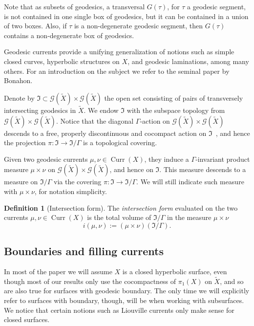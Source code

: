 \documentclass[12pt,article]{amsart}
\numberwithin{equation}{section}
\numberwithin{figure}{section}
\theoremstyle{definition}
\newtheorem{definition}[equation]{Definition}
\theoremstyle{plain}
\DeclareMathOperator{\Curr}{Curr}
\newcommand*{\wt}[1]{\widetilde{#1}}
\begin{document}
  Note that as subsets of geodesics, a transversal $G(\tau)$, for $\tau$ a geodesic segment, is not contained in one single box of geodesics, but it can be contained in a union of two boxes. Also, if $\tau$ is a non-degenerate geodesic segment, then $G(\tau)$ contains a non-degenerate box of geodesics.
 
 Geodesic currents provide a unifying generalization of notions such as simple closed curves, hyperbolic structures on $X$, and geodesic laminations, among many others. For an introduction on the subject we refer to the seminal paper \cite{Bonahon88:GeodesicCurrent} by Bonahon.
 
 
 Denote by $\mathfrak{I} \subset  \mathcal{G}(\wt{X}) \times  \mathcal{G}(\wt{X})$ the open set consisting of pairs of transversely intersecting geodesics in $\wt{X}$. 
 We endow $\mathfrak{I}$ with the subspace topology from $\mathcal{G}(\wt{X}) \times  \mathcal{G}(\wt{X})$. Notice that the diagonal $\Gamma$-action on $\mathcal{G}(\wt{X}) \times \mathcal{G}(\wt{X})$ descends to a free, properly discontinuous and cocompact action on $\mathfrak{I}$~\cite[Page~44]{ES22:GeodesicCount}, and hence the projection $\pi \colon \mathfrak{I} \to \mathfrak{I}/\Gamma$ is a topological covering. 
 
 Given two geodesic currents $\mu, \nu \in \Curr(X)$, they induce a $\Gamma$-invariant product measure $\mu \times \nu$ on $\mathcal{G}(\wt{X}) \times \mathcal{G}(\wt{X})$, and hence on $\mathfrak{I}$. This measure descends to a measure on $\mathfrak{I}/\Gamma$ via the covering $\pi \colon \mathfrak{I} \to \mathfrak{I}/\Gamma$. We will still indicate such measure  with $\mu \times \nu$, for notation simplicity. 
 
 \begin{definition}[Intersection form]
 The \emph{intersection form} evaluated on the two currents $\mu, \nu \in \Curr(X)$ is the total volume of $\mathfrak{I}/\Gamma$ in the measure $\mu \times \nu$
 \[
 i(\mu, \nu) := \left( \mu \times \nu \right) \left( \mathfrak{I}/\Gamma  \right).
 \]
 \label{def:intersection}
 \end{definition}

\subsection{Boundaries and filling currents}
\label{subsec:filling_boundary}
 In most of the paper we will assume $X$ is a closed hyperbolic surface, even though most of our results only use the cocompactness of $\pi_1(X)$ on $\wt{X}$, and so are also true for surfaces with geodesic boundary. The only time we will explicitly refer to surfaces with boundary, though, will be when working with subsurfaces.
We notice that certain notions such as Liouville currents only make sense for closed surfaces.
\end{document}
